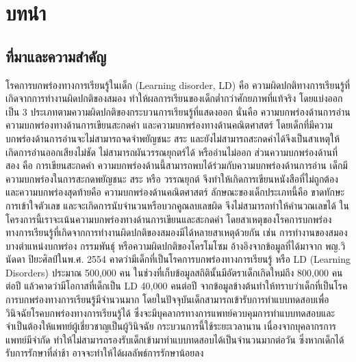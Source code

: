 \documentclass[12pt,oneside,openright,a4paper]{cpe-thai-project}
\begin{document}



\chapter{บทนำ}






\section{ที่มาและความสำคัญ}

\par โรคการบกพร่องทางการเรียนรู้ในเด็ก (Learning disorder, LD) คือ ความผิดปกติทางการเรียนรู้ที่เกิดจากการทำงานผิดปกติของสมอง ทำให้ผลการเรียนของเด็กต่ำกว่าศักยภาพที่แท้จริง โดยแบ่งออกเป็น 3 ประเภทตามความผิดปกติของกระบวนการเรียนรู้ที่แสดงออก นั่นคือ ความบกพร่องด้านการอ่าน ความบกพร่องทางด้านการเขียนสะกดคำ และความบกพร่องทางด้านคณิตศาสตร์ โดยเด็กที่มีความบกพร่องด้านการอ่านจะไม่สามารถจดจำพยัญชนะ สระ และยังไม่สามารถสะกดคำได้จึงเป็นสาเหตุให้  เกิดการอ่านออกเสียงไม่ชัด ไม่สามารถผันวรรณยุกตร์ได้ หรืออ่านไม่ออก ส่วนความบกพร่องด้านที่สอง คือ   การเขียนสะกดคำ ความบกพร่องด้านนี้สามารถพบได้ร่วมกับความบกพร่องด้านการอ่าน เด็กมีความบกพร่องในการสะกดพยัญชนะ สระ หรือ วรรณยุกต์ จึงทำให้เกิดการเขียนหนังสือที่ไม่ถูกต้อง และความบกพร่องสุดท้ายคือ ความบกพร่องด้านคณิตศาสตร์ ลักษณะของเด็กประเภทนี้คือ ขาดทักษะการเข้าใจตัวเลข และจะเกิดการนับจำนวนหรือบวกคูณลบเลขผิด จึงไม่สามารถทำให้คำนวณเลขได้ ในโครงการนี้เราจะเน้นความบกพร่องทางด้านการเขียนและสะกดคำ โดยสาเหตุของโรคการบกพร่องทางการเรียนรู้ที่เกิดจากการทำงานผิดปกติของสมองมีได้หลายสาเหตุด้วยกัน เช่น การทำงานของสมองบางตำแหน่งบกพร่อง กรรมพันธุ์ หรือความผิดปกติของโครโมโซม อ้างอิงจากข้อมูลที่ได้มาจาก พญ.วินัดดา ปิยะศิลป์ในพ.ศ. 2554 คาดว่ามีเด็กที่เป็นโรคการบกพร่องทางการเรียนรู้ หรือ LD (Learning  Disorders)  ประมาณ 500,000 คน ในช่วงที่เก็บข้อมูลสถิตินั้นมีอัตราเด็กเกิดใหม่ถึง 800,000 คนต่อปี แล้วคาดว่ามีโอกาสที่เด็กเป็น LD 40,000 คนต่อปี จากข้อมูลข้างต้นทำให้ทราบว่าเด็กที่เป็นโรคการบกพร่องทางการเรียนรู้มีจำนวนมาก  โดยในปัจจุบันเด็กสามารถเข้ารับการทำแบบทดสอบเพื่อวินิจฉัยโรคบกพร่องทางการเรียนรู้ได้ ซึ่งจะมีบุคลากรทางการแพทย์ควบคุมการทำแบบทดสอบและจำเป็นต้องให้แพทย์ผู้เชี่ยวชาญเป็นผู้วินิจฉัย กระบวนการนี้ใช้ระยะเวลานาน เนื่องจากบุคลากรการแพทย์มีจำกัด ทำให้ไม่สามารถรองรับเด็กเข้ามาทำแบบทดสอบได้เป็นจำนวนมากต่อวัน ซึ่งหากเด็กได้รับการรักษาที่ล่าช้า อาจจะทำให้ได้ผลลัพธ์การรักษาน้อยลง
\end{document}

